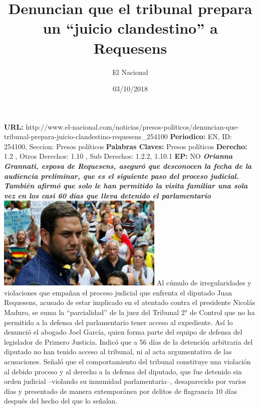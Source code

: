 \documentclass{article}%
\title{\textbf{Denuncian que el tribunal prepara un “juicio clandestino” a Requesens}}%
\author{El Nacional}%
\date{03/10/2018}%
\begin{document}
%
\normalsize%
\maketitle%
\textbf{URL: }%
http://www.el{-}nacional.com/noticias/presos{-}politicos/denuncian{-}que{-}tribunal{-}prepara{-}juicio{-}clandestino{-}requesens\_254100\newline%
%
\textbf{Periodico: }%
EN, %
ID: %
254100, %
Seccion: %
Presos políticos\newline%
%
\textbf{Palabras Claves: }%
Presos políticos\newline%
%
\textbf{Derecho: }%
1.2%
, Otros Derechos: %
1.10%
, Sub Derechos: %
1.2.2, 1.10.1%
\newline%
%
\textbf{EP: }%
NO\newline%
\newline%
%
\textbf{\textit{Orianna Grannati, esposa de Requesens, aseguró que desconocen la fecha de la audiencia preliminar, que es el siguiente paso del proceso judicial. También afirmó que solo le han permitido la visita familiar una sola vez en los casi 60 días que lleva detenido el parlamentario~}}%
\newline%
\newline%
%
\includegraphics[width=300px]{112.jpg}%
\newline%
%
Al cúmulo de irregularidades y violaciones que empañan el proceso judicial que enfrenta el diputado Juan Requesens, acusado de estar implicado en el atentado contra el presidente Nicolás Maduro, se suma la “parcialidad” de la juez del Tribunal 2° de Control que no ha permitido a la defensa del parlamentario tener acceso al expediente.%
\newline%
%
Así lo denunció el abogado Joel García, quien forma parte del equipo de defensa del legislador de Primero Justicia. Indicó que a 56 días de la detención arbitraria del diputado no han tenido acceso al tribunal, ni al acta argumentativa de las acusaciones.%
\newline%
%
Señaló que el comportamiento del tribunal constituye una violación al debido proceso y al derecho a la defensa del diputado, que fue detenido sin orden judicial –violando su inmunidad parlamentaria–, desaparecido por varios días y presentado de manera extemporánea por delitos de flagrancia 10 días después del hecho del que lo señalan.%
\end{document}
